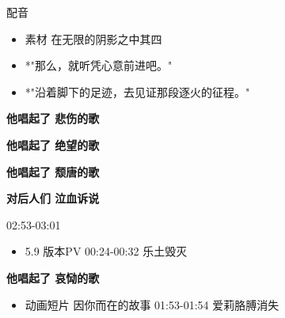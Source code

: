 \documentclass[a4paper]{article}
\begin{document}
配音

\begin{itemize}
    \item 素材 在无限的阴影之中其四
    \item *"那么，就听凭心意前进吧。"
    \item *"沿着脚下的足迹，去见证那段逐火的征程。"
\end{itemize}



\textbf{他唱起了 悲伤的歌}

\textbf{他唱起了 绝望的歌}

\textbf{他唱起了 颓唐的歌}

\textbf{对后人们 泣血诉说}

02:53-03:01

\begin{itemize}
    \item 5.9 版本PV 00:24-00:32 乐土毁灭
\end{itemize}


\textbf{他唱起了 哀恸的歌}

\begin{itemize}
    \item 动画短片 因你而在的故事 01:53-01:54 爱莉胳膊消失
\end{itemize}
\end{document}
